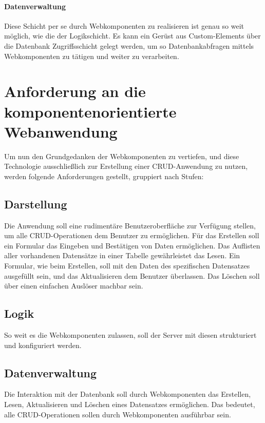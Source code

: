 \paragraph{Datenverwaltung}Diese Schicht per se durch Webkomponenten zu realisieren ist genau so weit möglich, wie die der Logikschicht. Es kann ein Gerüst aus Custom-Elements über die Datenbank Zugriffsschicht gelegt werden, um so Datenbankabfragen mittels Webkomponenten zu tätigen und weiter zu verarbeiten. 


\section{Anforderung an die komponentenorientierte Webanwendung}
Um nun den Grundgedanken der Webkomponenten zu vertiefen, und diese Technologie ausschließlich zur Erstellung einer CRUD-Anwendung zu nutzen, werden folgende Anforderungen gestellt, gruppiert nach Stufen:

\subsection{Darstellung}
Die Anwendung soll eine rudimentäre Benutzeroberfläche zur Verfügung stellen, um alle CRUD-Operationen dem Benutzer zu ermöglichen. 
Für das Erstellen soll ein Formular das Eingeben und Bestätigen von Daten ermöglichen.
Das Auflisten aller vorhandenen Datensätze in einer Tabelle gewährleistet das Lesen.
Ein Formular, wie beim Erstellen, soll mit den Daten des spezifischen Datensatzes ausgefüllt sein, und das Aktualisieren dem Benutzer überlassen.
Das Löschen soll über einen einfachen Auslöser machbar sein.
\subsection{Logik}
So weit es die Webkomponenten zulassen, soll der Server mit diesen strukturiert und konfiguriert werden.

\subsection{Datenverwaltung}
Die Interaktion mit der Datenbank soll durch Webkomponenten das Erstellen, Lesen, Aktualisieren und Löschen eines Datensatzes ermöglichen. Das bedeutet, alle CRUD-Operationen sollen durch Webkomponenten ausführbar sein. 

